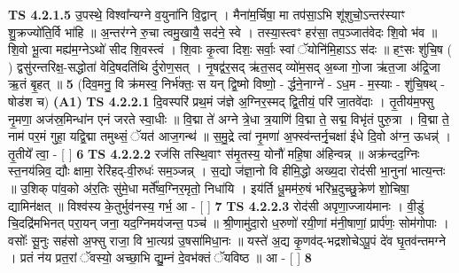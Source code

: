 \documentclass[17pt]{extarticle}
\begin{document}
                  \newline
                                \textbf{ TS 4.2.1.5} \newline
                  उ॒पस्थे॒ विश्वा᳚न्यग्ने व॒युना॑नि वि॒द्वान् । मैना॑म॒र्चिषा॒ मा तप॑सा॒ऽभि शू॑शुचो॒ऽन्तर॑स्याꣳ शु॒क्रज्यो॑ति॒र्वि भा॑हि ॥ अ॒न्तर॑ग्ने रु॒चा त्वमु॒खायै॒ सद॑ने॒ स्वे । तस्या॒स्त्वꣳ हर॑सा॒ तप॒ञ्जात॑वेदः शि॒वो भ॑व ॥ शि॒वो भू॒त्वा मह्य॑म॒ग्नेऽथो॑ सीद शि॒वस्त्वं । शि॒वाः कृ॒त्वा दिशः॒ सर्वाः॒ स्वां ॅयोनि॑मि॒हाऽऽ स॑दः ॥ हꣳ॒॒सः शु॑चि॒ष ( ) द्वसु॑रन्तरिक्ष॒-सद्धोता॑ वेदि॒षदति॑थि र्दुरोण॒सत् । नृ॒षद्व॑र॒सद् ऋ॑त॒सद् व्यो॑म॒सद् अ॒ब्जा गो॒जा ऋ॑त॒जा अ॑द्रि॒जा ऋ॒तं बृ॒हत् ॥ \textbf{  5 } \newline
                  \newline
                      (दिव॒मनु॒ वि क्र॑मस्व॒ निर्भ॑क्तः॒ स यन् द्वि॒ष्मो विष्णो॒ - र्द्धने॒नाग्ने॑ - ऽध॒म - म॒स्याः - शु॑चि॒षथ् - षोड॑श च)  \textbf{(A1)} \newline \newline
                                        \textbf{ TS 4.2.2.1} \newline
                  दि॒वस्परि॑ प्रथ॒मं ज॑ज्ञे अ॒ग्निर॒स्मद् द्वि॒तीयं॒ परि॑ जा॒तवे॑दाः । तृ॒तीय॑म॒फ्सु नृ॒मणा॒ अज॑स्र॒मिन्धा॑न एनं जरते स्वा॒धीः ॥ वि॒द्मा ते॑ अग्ने त्रे॒धा त्र॒याणि॑ वि॒द्मा ते॒ सद्म॒ विभृ॑तं पुरु॒त्रा । वि॒द्मा ते॒ नाम॑ पर॒मं गुहा॒ यद्वि॒द्मा तमुथ्सं॒ ॅयत॑ आज॒गन्थ॑ ॥ स॒मु॒द्रे त्वा॑ नृ॒मणा॑ अ॒फ्स्व॑न्तर्नृ॒चक्षा॑ ईधे दि॒वो अ॑ग्न॒ ऊधन्न्॑ । तृ॒तीये᳚ त्वा॒ - [  ] \textbf{  6} \newline
                  \newline
                                \textbf{ TS 4.2.2.2} \newline
                  रज॑सि तस्थि॒वाꣳ स॑मृ॒तस्य॒ योनौ॑ महि॒षा अ॑हिन्वन्न् ॥ अक्र॑न्दद॒ग्निः स्त॒नय॑न्निव॒ द्यौः क्षामा॒ रेरि॑हद्-वी॒रुधः॑ सम॒ञ्जन्न् । स॒द्यो ज॑ज्ञा॒नो वि हीमि॒द्धो अख्य॒दा रोद॑सी भा॒नुना॑ भात्य॒न्तः ॥ उ॒शिक् पा॑व॒को अ॑र॒तिः सु॑मे॒धा मर्ते᳚ष्व॒ग्निर॒मृतो॒ निधा॑यि । इय॑र्ति धू॒मम॑रु॒षं भरि॑भ्र॒दुच्छु॒क्रेण॑ शो॒चिषा॒ द्यामिन॑क्षत् ॥ विश्व॑स्य के॒तुर्भुव॑नस्य॒ गर्भ॒ आ - [  ] \textbf{  7} \newline
                  \newline
                                \textbf{ TS 4.2.2.3} \newline
                  रोद॑सी अपृणा॒ज्जाय॑मानः । वी॒डुं चि॒दद्रि॑मभिनत् परा॒यन् जना॒ यद॒ग्निमय॑जन्त॒ पञ्च॑ ॥ श्री॒णामु॑दा॒रो ध॒रुणो॑ रयी॒णां म॑नी॒षाणां॒ प्रार्प॑णः॒ सोम॑गोपाः । वसोः᳚ सू॒नुः सह॑सो अ॒फ्सु राजा॒ वि भा॒त्यग्र॑ उ॒षसा॑मिधा॒नः ॥ यस्ते॑ अ॒द्य कृ॒णव॑द्-भद्रशोचेऽपू॒पं दे॑व घृ॒तव॑न्तमग्ने । प्रतं न॑य प्रत॒रां ॅवस्यो॒ अच्छा॒भि द्यु॒म्नं दे॒वभ॑क्तं ॅयविष्ठ ॥ आ - [  ] \textbf{  8} \newline
\end{document}
